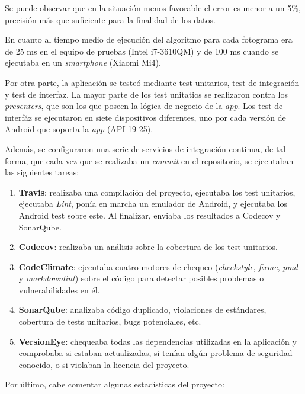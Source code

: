Se puede observar que en la situación menos favorable el error es menor
a un 5\%, precisión más que suficiente para la finalidad de los datos.

En cuanto al tiempo medio de ejecución del algoritmo para cada fotograma
era de 25 ms en el equipo de pruebas (Intel i7-3610QM) y de 100 ms
cuando se ejecutaba en un \emph{smartphone} (Xiaomi Mi4).

Por otra parte, la aplicación se testeó mediante test unitarios, test de
integración y test de interfaz. La mayor parte de los test unitatios se
realizaron contra los \emph{presenters}, que son los que poseen la
lógica de negocio de la \emph{app}. Los test de interfáz se ejecutaron
en siete dispositivos diferentes, uno por cada versión de Android que
soporta la \emph{app} (API 19-25).

Además, se configuraron una serie de servicios de integración continua,
de tal forma, que cada vez que se realizaba un \emph{commit} en el
repositorio, se ejecutaban las siguientes tareas:

\begin{enumerate}
\def\labelenumi{\arabic{enumi}.}
\tightlist
\item
  \textbf{Travis}: realizaba una compilación del proyecto, ejecutaba los
  test unitarios, ejecutaba \emph{Lint}, ponía en marcha un emulador de
  Android, y ejecutaba los Android test sobre este. Al finalizar,
  enviaba los resultados a Codecov y SonarQube.
\item
  \textbf{Codecov}: realizaba un análisis sobre la cobertura de los test
  unitarios.
\item
  \textbf{CodeClimate}: ejecutaba cuatro motores de chequeo
  (\emph{checkstyle}, \emph{fixme}, \emph{pmd} y \emph{markdownlint})
  sobre el código para detectar posibles problemas o vulnerabilidades en
  él.
\item
  \textbf{SonarQube}: analizaba código duplicado, violaciones de
  estándares, cobertura de tests unitarios, bugs potenciales, etc.
\item
  \textbf{VersionEye}: chequeaba todas las dependencias utilizadas en la
  aplicación y comprobaba si estaban actualizadas, si tenían algún
  problema de seguridad conocido, o si violaban la licencia del
  proyecto.
\end{enumerate}


Por último, cabe comentar algunas estadísticas del proyecto:

